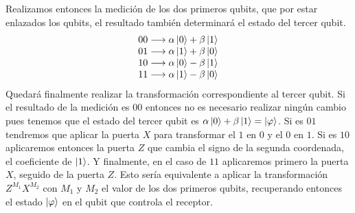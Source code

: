 \documentclass[a4paper]{article}
\numberwithin{equation}{section}
\begin{document}
Realizamos entonces la medición de los dos primeros qubits, que por estar enlazados los qubits, el resultado también determinará el estado del tercer qubit.
\begin{equation}
\begin{array}{l}
00 \longrightarrow \alpha\ket{0}+\beta\ket{1} \\
01 \longrightarrow \alpha\ket{1}+\beta\ket{0} \\
10 \longrightarrow \alpha\ket{0}-\beta\ket{1} \\
11 \longrightarrow \alpha\ket{1}-\beta\ket{0}
\end{array}
\end{equation}
Quedará finalmente realizar la transformación correspondiente al tercer qubit. Si el resultado de la medición es $00$ entonces no es necesario realizar ningún cambio pues tenemos que el estado del tercer qubit es $\alpha\ket{0}+\beta\ket{1} = \ket{\varphi}$. Si es $01$ tendremos que aplicar la puerta $X$ para transformar el $1$ en $0$ y el $0$ en $1$. Si es $10$ aplicaremos entonces la puerta $Z$ que cambia el signo de la segunda coordenada, el coeficiente de $\ket{1}$. Y finalmente, en el caso de $11$ aplicaremos primero la puerta $X$, seguido de la puerta $Z$.
Esto sería equivalente a aplicar la transformación $Z^{M_1} X^{M_2}$ con $M_1$ y $M_2$ el valor de los dos primeros qubits, recuperando entonces el estado $\ket{\varphi}$ en el qubit que controla el receptor.\\
\end{document}
